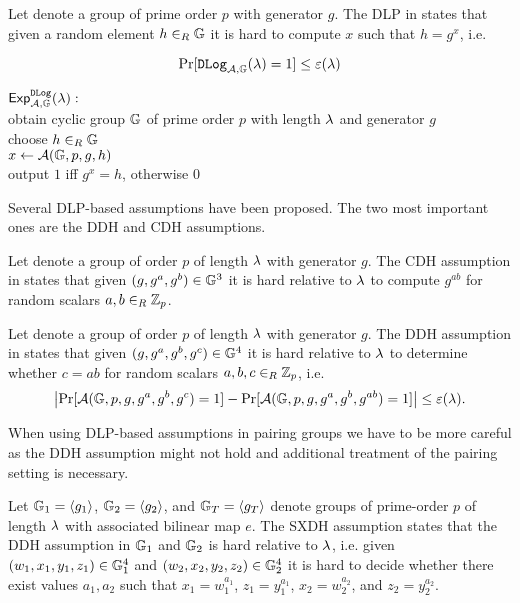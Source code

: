\begin{definition}\label{def:dlp}
Let \GG denote a group of prime order $p$ with generator $g$.
The \ac{DLP} in \GG states that given a random element $h\rin\GG$ it is hard to compute $x$ such that $h=g^x$, i.e. 

\[
  \Pr[\DLog_{\cA,\GG}(\secpar)=1] \leq \varepsilon(\secpar)
\]

\noindent
$\Exp_{\cA,\GG}^{\DLog}(\secpar):$\\
\hspace*{2em} obtain cyclic group $\GG$ of prime order $p$ with length $\secpar$ and generator $g$\\
\hspace*{2em} choose $h\rin\GG$\\
\hspace*{2em} $x \gets \cA(\GG, p, g, h)$\\
\hspace*{2em} output $1$ iff $g^x=h$, otherwise $0$\\
\eod
\end{definition}

\noindent
Several \ac{DLP}-based assumptions have been proposed.
The two most important ones are the \ac{DDH} and \ac{CDH} assumptions.

\begin{definition}\label{def:cdh}
Let \GG denote a group of order $p$ of length $\secpar$ with generator $g$.
The \ac{CDH} assumption in \GG states that given $(g,g^a,g^b)\in\GG^3$ it is hard relative to $\secpar$ to compute $g^{ab}$ for random scalars $a,b\rin\ZZ_p$.
\eod
\end{definition}

\begin{definition}\label{def:ddh}
Let \GG denote a group of order $p$ of length $\secpar$ with generator $g$.
The \ac{DDH} assumption in \GG states that given $(g,g^a,g^b,g^c)\in\GG^4$ it is hard relative to $\secpar$ to determine whether $c=ab$ for random scalars $a,b,c\rin\ZZ_p$, i.e. 
\[
  \left| \Pr[\cA(\GG, p, g, g^a, g^b, g^c)=1] - \Pr[\cA(\GG, p, g, g^a, g^b, g^{ab})=1] \right| \leq \varepsilon(\secpar).
\]
\eod
\end{definition}

\noindent
When using \ac{DLP}-based assumptions in pairing groups we have to be more careful as the \ac{DDH} assumption might not hold and additional treatment of the pairing setting is necessary.

\begin{definition}\label{def:sxdh}
Let $\GG_1=\genG[1]$, $\GG_2=\genG[2]$, and $\GG_T=\genG[T]$ denote groups of prime-order $p$ of length $\secpar$ with associated bilinear map $e$.
The \ac{SXDH} assumption states that the DDH assumption in $\GG_1$ and $\GG_2$ is hard relative to $\secpar$, i.e. given $(w_1,x_1,y_1,z_1)\in\GG^4_1$ and $(w_2,x_2,y_2,z_2)\in\GG^4_2$ it is hard to decide whether there exist values $a_1,a_2$ such that $x_1=w_1^{a_1}$, $z_1=y_1^{a_1}$, $x_2=w_2^{a_2}$, and $z_2=y_2^{a_2}$.
\eod
\end{definition}

